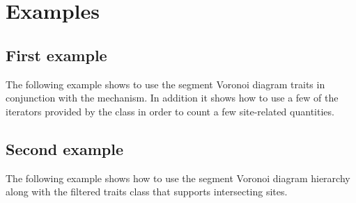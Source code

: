 
\section{Examples}
\label{sec:segvor2-examples}

\subsection{First example}

The following example shows to use the segment Voronoi diagram traits
in conjunction with the  mechanism. In
addition it shows how to use a few of the iterators provided by the
 class in order to count a few
site-related quantities.


\subsection{Second example}

The following example shows how to use the segment Voronoi diagram
hierarchy along with the filtered traits class that supports
intersecting sites.





